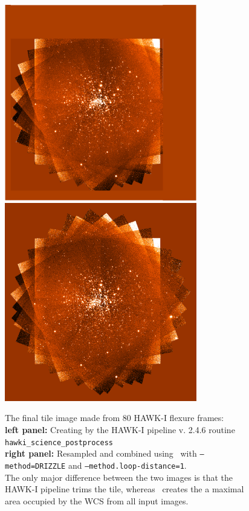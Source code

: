  \begin{figure}[ht]
\centering
\includegraphics[width=8.4cm]{figures/Flexure_M30_TILED_IMAGE.png}
\includegraphics[width=8.4cm]{figures/hdrldemo_resample_DRIZZLE_HAWKI_rotation_1.png} 
\caption[]
	{\footnotesize  The final tile image made from 80 HAWK-I flexure frames:\\
	{\bf left panel:}    Creating by the HAWK-I pipeline v. 2.4.6 routine {\tt hawki\_science\_postprocess}\\
	{\bf right panel:} Resampled and combined using \hdrlresample\ with {\tt --method=DRIZZLE} and {\tt --method.loop-distance=1}.\\
	The only major difference between the two images is that the HAWK-I pipeline trims the tile, whereas \hdrlresample\ creates the a maximal
	area occupied by the WCS from all input images.
	}
	\label{fig:hawki_flexure}
\end{figure}

